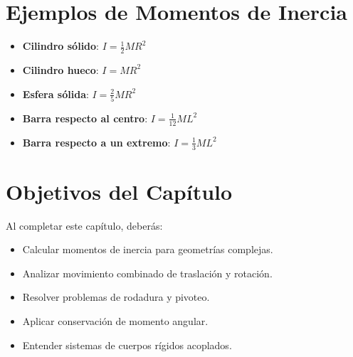 \section{Ejemplos de Momentos de Inercia}

\begin{itemize}
    \item \textbf{Cilindro sólido}: $I = \frac{1}{2}MR^2$
    \item \textbf{Cilindro hueco}: $I = MR^2$
    \item \textbf{Esfera sólida}: $I = \frac{2}{5}MR^2$
    \item \textbf{Barra respecto al centro}: $I = \frac{1}{12}ML^2$
    \item \textbf{Barra respecto a un extremo}: $I = \frac{1}{3}ML^2$
\end{itemize}

\section*{Objetivos del Capítulo}

Al completar este capítulo, deberás:
\begin{itemize}
    \item Calcular momentos de inercia para geometrías complejas.
    \item Analizar movimiento combinado de traslación y rotación.
    \item Resolver problemas de rodadura y pivoteo.
    \item Aplicar conservación de momento angular.
    \item Entender sistemas de cuerpos rígidos acoplados.
\end{itemize}

\newpage
